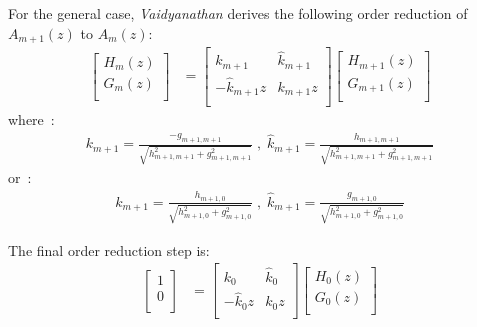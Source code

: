 \documentclass[a4paper,twoside,10pt,english]{report}
\begin{document}
For the general case, \emph{Vaidyanathan} derives the following order
reduction of $A_{m+1}\left(z\right)$ to $A_{m}\left(z\right)$:
\begin{align*}
\left[\begin{array}{c}
H_{m}\left(z\right) \\
G_{m}\left(z\right) \\
  \end{array}\right] & = 
\left[\begin{array}{cc}
k_{m+1} & \hat{k}_{m+1} \\
-\hat{k}_{m+1}z & k_{m+1}z \\
  \end{array}\right] 
\left[\begin{array}{c}
H_{m+1}\left(z\right) \\
G_{m+1}\left(z\right) \\
  \end{array}\right]
\end{align*}
where~\cite[Equations 13 and 14]{Vaidyanathan_PassiveCascadedLatticeFIR}:
\begin{align}
k_{m+1} = \frac{-g_{m+1,m+1}}{\sqrt{h_{m+1,m+1}^{2}+g_{m+1,m+1}^{2}}} \; , \;
  \hat{k}_{m+1} = \frac{h_{m+1,m+1}}{\sqrt{h_{m+1,m+1}^{2}+g_{m+1,m+1}^{2}}}
  \label{eqn:complementary-FIR-lattice-order-reduction-eqns-13-14}
\end{align}
or~\cite[Equation 23]{Vaidyanathan_PassiveCascadedLatticeFIR}:
\begin{align}
  k_{m+1} = \frac{h_{m+1,0}}{\sqrt{h_{m+1,0}^{2}+g_{m+1,0}^{2}}} \; , \;
  \hat{k}_{m+1} = \frac{g_{m+1,0}}{\sqrt{h_{m+1,0}^{2}+g_{m+1,0}^{2}}}
  \label{eqn:complementary-FIR-lattice-order-reduction-eqn-23}
\end{align}

The final order reduction step is:
\begin{align*}
  \left[\begin{array}{c}
        1 \\
        0 \\
        \end{array}\right] & = 
\left[\begin{array}{cc}
k_{0} & \hat{k}_{0} \\
-\hat{k}_{0}z & k_{0}z \\
  \end{array}\right] 
\left[\begin{array}{c}
H_{0}\left(z\right) \\
G_{0}\left(z\right) \\
  \end{array}\right]
\end{align*}
\end{document}
